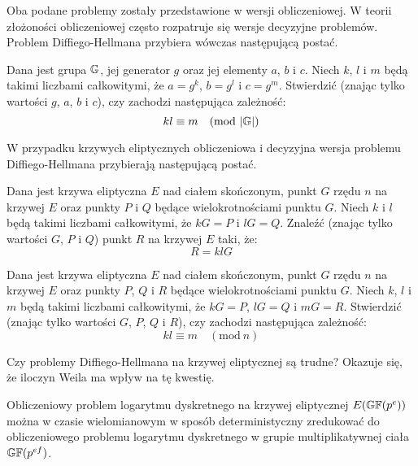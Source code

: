 \noindent
Oba podane problemy zostały przedstawione w wersji obliczeniowej.
W teorii złożoności obliczeniowej często rozpatruje się wersje decyzyjne
problemów. Problem Diffiego-Hellmana przybiera wówczas następującą postać.

\begin{problem}
Dana jest grupa $\mathbb{G}$,
jej generator $g$
oraz jej elementy $a$, $b$ i $c$.
Niech $k$, $l$ i $m$ będą takimi liczbami całkowitymi,
że $a = g^k$, $b = g^l$ i $c = g^m$.
Stwierdzić (znając tylko wartości $g$, $a$, $b$ i $c$),
czy zachodzi następująca zależność:
\begin{equation}
kl \equiv m \quad (\mathrm{mod}\ \lvert\mathbb{G}\rvert)
\end{equation}
\end{problem}

\noindent
W przypadku krzywych eliptycznych
obliczeniowa i decyzyjna wersja problemu Diffiego-Hellmana
przybierają następującą postać.

\begin{problem}
Dana jest krzywa eliptyczna $E$ nad ciałem skończonym,
punkt $G$ rzędu $n$ na krzywej $E$
oraz punkty $P$ i $Q$ będące wielokrotnościami punktu $G$.
Niech $k$ i $l$ będą takimi liczbami całkowitymi,
że $kG = P$ i $lG = Q$.
Znaleźć (znając tylko wartości $G$, $P$ i $Q$)
punkt $R$ na krzywej $E$ taki, że:
\begin{equation}
R = klG
\end{equation}
\end{problem}

\begin{problem}
Dana jest krzywa eliptyczna $E$ nad ciałem skończonym,
punkt $G$ rzędu $n$ na krzywej $E$
oraz punkty $P$, $Q$ i $R$ będące wielokrotnościami punktu $G$.
Niech $k$, $l$ i $m$ będą takimi liczbami całkowitymi,
że $kG = P$, $lG = Q$ i $mG = R$.
Stwierdzić (znając tylko wartości $G$, $P$, $Q$ i $R$),
czy zachodzi następująca zależność:
\begin{equation}
kl \equiv m \quad (\mathrm{mod}\ n)
\end{equation}
\end{problem}

\noindent
Czy problemy Diffiego-Hellmana na krzywej eliptycznej są trudne?
Okazuje się, że iloczyn Weila ma wpływ na tę kwestię.

\begin{theorem}
Obliczeniowy problem logarytmu dyskretnego
na krzywej eliptycznej $E(\mathbb{GF}(p^e))$
można w czasie wielomianowym w sposób deterministyczny zredukować
do obliczeniowego problemu logarytmu dyskretnego
w grupie multiplikatywnej ciała $\mathbb{GF}(p^{ef})$.
\end{theorem}

